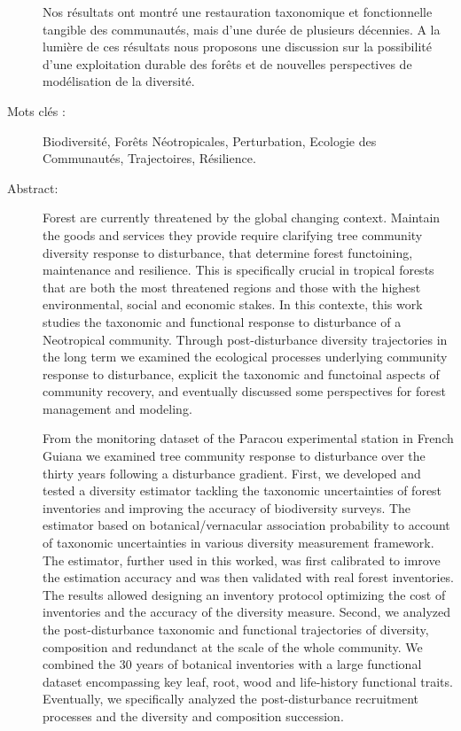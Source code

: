 \documentclass[
  11pt,
  french,
  A4paper,
  extrafontsizes,onecolumn,openright
  ]{memoir}
\begin{document}
\begin{normalsize}
\begin{description}
Nos résultats ont montré une restauration taxonomique et fonctionnelle
tangible des communautés, mais d'une durée de plusieurs décennies. A la
lumière de ces résultats nous proposons une discussion sur la
possibilité d'une exploitation durable des forêts et de nouvelles
perspectives de modélisation de la diversité.\newline

\item[Mots clés :]
Biodiversité, Forêts Néotropicales, Perturbation, Ecologie des Communautés, Trajectoires, Résilience.
~\\

\item[Abstract:]
Forest are currently threatened by the global changing context. Maintain
the goods and services they provide require clarifying tree community
diversity response to disturbance, that determine forest functoining,
maintenance and resilience. This is specifically crucial in tropical
forests that are both the most threatened regions and those with the
highest environmental, social and economic stakes. In this contexte,
this work studies the taxonomic and functional response to disturbance
of a Neotropical community. Through post-disturbance diversity
trajectories in the long term we examined the ecological processes
underlying community response to disturbance, explicit the taxonomic and
functoinal aspects of community recovery, and eventually discussed some
perspectives for forest management and modeling.\newline

From the monitoring dataset of the Paracou experimental station in
French Guiana we examined tree community response to disturbance over
the thirty years following a disturbance gradient. First, we developed
and tested a diversity estimator tackling the taxonomic uncertainties of
forest inventories and improving the accuracy of biodiversity surveys.
The estimator based on botanical/vernacular association probability to
account of taxonomic uncertainties in various diversity measurement
framework. The estimator, further used in this worked, was first
calibrated to imrove the estimation accuracy and was then validated with
real forest inventories. The results allowed designing an inventory
protocol optimizing the cost of inventories and the accuracy of the
diversity measure. Second, we analyzed the post-disturbance taxonomic
and functional trajectories of diversity, composition and redundanct at
the scale of the whole community. We combined the 30 years of botanical
inventories with a large functional dataset encompassing key leaf, root,
wood and life-history functional traits. Eventually, we specifically
analyzed the post-disturbance recruitment processes and the diversity
and composition succession.\newline


\end{description}
\end{normalsize}
\end{document}
